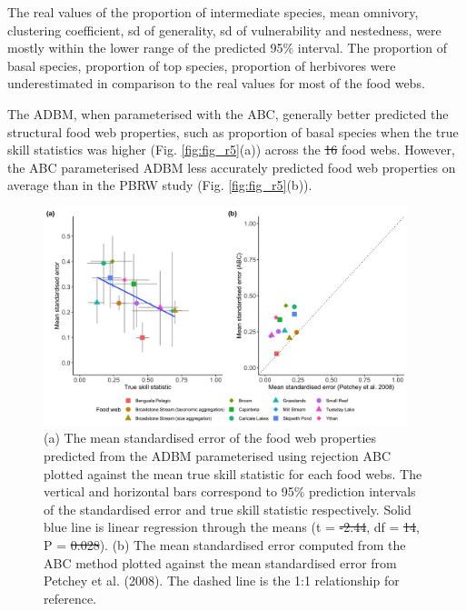 \documentclass{article}
\providecommand{\DIFaddtex}[1]{{\protect\color{blue}\uwave{#1}}} %
\providecommand{\DIFdeltex}[1]{{\protect\color{red}\sout{#1}}}                      %
\providecommand{\DIFaddbegin}{} %
\providecommand{\DIFaddend}{} %
\providecommand{\DIFdelbegin}{} %
\providecommand{\DIFdelend}{} %
\providecommand{\DIFaddFL}[1]{\DIFadd{#1}} %
\providecommand{\DIFdelFL}[1]{\DIFdel{#1}} %
\providecommand{\DIFaddbeginFL}{} %
\providecommand{\DIFaddendFL}{} %
\providecommand{\DIFdelbeginFL}{} %
\providecommand{\DIFdelendFL}{} %
\providecommand{\DIFadd}[1]{\texorpdfstring{\DIFaddtex{#1}}{#1}} %
\providecommand{\DIFdel}[1]{\texorpdfstring{\DIFdeltex{#1}}{}} %
\newcommand{\DIFscaledelfig}{0.5}
\newlength{\DIFdelgraphicswidth} %
\newlength{\DIFdelgraphicsheight} %
\newcommand{\DIFaddincludegraphics}[2][]{{\color{blue}\fbox{\DIFOincludegraphics[#1]{#2}}}} %
\newcommand{\DIFdelincludegraphics}[2][]{%
\sbox{\DIFdelgraphicsbox}{\DIFOincludegraphics[#1]{#2}}%
\settoboxwidth{\DIFdelgraphicswidth}{\DIFdelgraphicsbox} %
\settoboxtotalheight{\DIFdelgraphicsheight}{\DIFdelgraphicsbox} %
\scalebox{\DIFscaledelfig}{%
\parbox[b]{\DIFdelgraphicswidth}{\usebox{\DIFdelgraphicsbox}\\[-\baselineskip] \rule{\DIFdelgraphicswidth}{0em}}\llap{\resizebox{\DIFdelgraphicswidth}{\DIFdelgraphicsheight}{%
\setlength{\unitlength}{\DIFdelgraphicswidth}%
\begin{picture}(1,1)%
\thicklines\linethickness{2pt} %
{\color[rgb]{1,0,0}\put(0,0){\framebox(1,1){}}}%
{\color[rgb]{1,0,0}\put(0,0){\line( 1,1){1}}}%
{\color[rgb]{1,0,0}\put(0,1){\line(1,-1){1}}}%
\end{picture}%
}\hspace*{3pt}}} %
} %
\DeclareRobustCommand{\DIFaddbegin}{\DIFOaddbegin \let\includegraphics\DIFaddincludegraphics} %
\DeclareRobustCommand{\DIFaddend}{\DIFOaddend \let\includegraphics\DIFOincludegraphics} %
\DeclareRobustCommand{\DIFdelbegin}{\DIFOdelbegin \let\includegraphics\DIFdelincludegraphics} %
\DeclareRobustCommand{\DIFdelend}{\DIFOaddend \let\includegraphics\DIFOincludegraphics} %
\DeclareRobustCommand{\DIFaddbeginFL}{\DIFOaddbeginFL \let\includegraphics\DIFaddincludegraphics} %
\DeclareRobustCommand{\DIFaddendFL}{\DIFOaddendFL \let\includegraphics\DIFOincludegraphics} %
\DeclareRobustCommand{\DIFdelbeginFL}{\DIFOdelbeginFL \let\includegraphics\DIFdelincludegraphics} %
\DeclareRobustCommand{\DIFdelendFL}{\DIFOaddendFL \let\includegraphics\DIFOincludegraphics} %
\begin{document}
\DIFaddend The real values of the proportion of intermediate species, mean
omnivory, clustering coefficient, sd of generality, sd of vulnerability
and nestedness, were mostly within the lower range of the predicted 95\%
interval. The proportion of basal species, proportion of top species,
proportion of herbivores were underestimated in comparison to the real
values for most of the food webs.

The ADBM, when parameterised with the ABC, generally better predicted
the structural food web properties, such as proportion of basal species
when the true skill statistics was higher (Fig. \ref{fig:fig_r5}(a))
across the \DIFdelbegin \DIFdel{16 }\DIFdelend \DIFaddbegin \DIFadd{12 }\DIFaddend food webs. However, the ABC parameterised ADBM less
accurately predicted food web properties on average than in the PBRW
study (Fig. \ref{fig:fig_r5}(b)).

\begin{figure}

{\centering \DIFdelbeginFL %
\DIFdelendFL \DIFaddbeginFL \includegraphics[width=400px]{fig/fig7} 
\DIFaddendFL 

}

\caption{\label{fig:fig_r5} (a) The mean standardised error of the food web properties predicted from the ADBM parameterised using rejection ABC plotted against the mean true skill statistic for each food webs. The vertical and horizontal bars correspond to 95\% prediction intervals of the standardised error and true skill statistic respectively. Solid blue line is linear regression through the means (t = \DIFdelbeginFL \DIFdelFL{-2.44}\DIFdelendFL \DIFaddbeginFL \DIFaddFL{-2.335}\DIFaddendFL , df = \DIFdelbeginFL \DIFdelFL{14}\DIFdelendFL \DIFaddbeginFL \DIFaddFL{10}\DIFaddendFL , P = \DIFdelbeginFL \DIFdelFL{0.028}\DIFdelendFL \DIFaddbeginFL \DIFaddFL{0.041}\DIFaddendFL ). (b) The mean standardised error computed from the ABC method plotted against the mean standardised error from Petchey et al. (2008). The dashed line is the 1:1 relationship for reference.}\DIFdelbeginFL %
\DIFdelendFL \DIFaddbeginFL \label{fig:unnamed-chunk-9}
\DIFaddendFL \end{figure}
\end{document}
